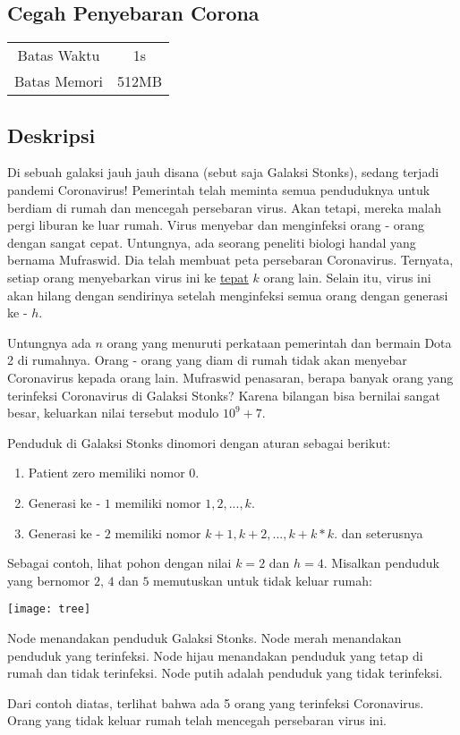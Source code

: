 \documentclass{article}
\begin{document}
\begin{center}
    \section*{Cegah Penyebaran Corona} %

    \begin{tabular}{ | c c | }
        \hline
        Batas Waktu  & 1s \\    %
        Batas Memori & 512MB \\  %
        \hline
    \end{tabular}
\end{center}

\subsection*{Deskripsi}

Di sebuah galaksi jauh jauh disana (sebut saja Galaksi Stonks), sedang terjadi pandemi Coronavirus! Pemerintah telah meminta semua penduduknya untuk berdiam di rumah dan mencegah persebaran virus. Akan tetapi, mereka malah pergi liburan ke luar rumah. Virus menyebar dan menginfeksi orang - orang dengan sangat cepat. Untungnya, ada seorang peneliti biologi handal yang bernama Mufraswid. Dia telah membuat peta persebaran Coronavirus. Ternyata, setiap orang menyebarkan virus ini ke \underline{tepat} $k$ orang lain. Selain itu, virus ini akan hilang dengan sendirinya setelah menginfeksi semua orang dengan generasi ke - $h$.
\par
Untungnya ada $n$ orang yang menuruti perkataan pemerintah dan bermain Dota 2 di rumahnya. Orang - orang yang diam di rumah tidak akan menyebar Coronavirus kepada orang lain. Mufraswid penasaran, berapa banyak orang yang terinfeksi Coronavirus di Galaksi Stonks? Karena bilangan bisa bernilai sangat besar, keluarkan nilai tersebut modulo $10^9 + 7$.
\par
Penduduk di Galaksi Stonks dinomori dengan aturan sebagai berikut:
\begin{enumerate}
    \setlength\itemsep{0pt}
    \item Patient zero memiliki nomor $0$.
    \item Generasi ke - $1$ memiliki nomor $1, 2, ..., k$.
    \item Generasi ke - $2$ memiliki nomor $k+1, k+2, ..., k+k*k$.
    dan seterusnya
\end{enumerate}
\par
Sebagai contoh, lihat pohon dengan nilai $k = 2$ dan $h = 4$. Misalkan penduduk yang bernomor $2$, $4$ dan $5$ memutuskan untuk tidak keluar rumah:
\begin{center}
\texttt{[image: tree]}
\end{center}
Node menandakan penduduk Galaksi Stonks. Node merah menandakan penduduk yang terinfeksi. Node hijau menandakan penduduk yang tetap di rumah dan tidak terinfeksi. Node putih adalah penduduk yang tidak terinfeksi.
\par
Dari contoh diatas, terlihat bahwa ada 5 orang yang terinfeksi Coronavirus. Orang yang tidak keluar rumah telah mencegah persebaran virus ini.
\pagebreak
\end{document}
